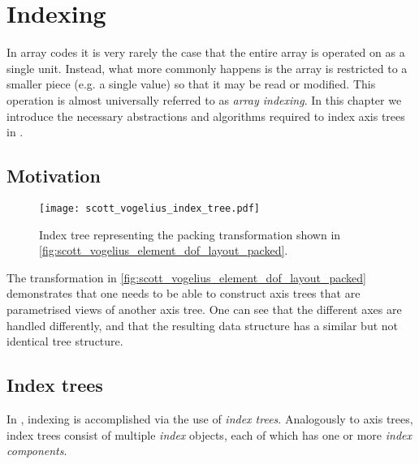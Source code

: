 \documentclass[thesis]{subfiles}
\begin{document}
\chapter{Indexing}
\label{chapter:indexing}

In array codes it is very rarely the case that the entire array is operated on as a single unit.
Instead, what more commonly happens is the array is restricted to a smaller piece (e.g. a single value) so that it may be read or modified.
This operation is almost universally referred to as \textit{array indexing}.
In this chapter we introduce the necessary abstractions and algorithms required to index axis trees in .

\section{Motivation}  %

\begin{figure}
  \centering
  \texttt{[image: scott\_vogelius\_index\_tree.pdf]}
  \caption{Index tree representing the packing transformation shown in \cref{fig:scott_vogelius_element_dof_layout_packed}.}
  \label{fig:scott_vogelius_element_index_tree}
\end{figure}



The transformation in \cref{fig:scott_vogelius_element_dof_layout_packed} demonstrates that one needs to be able to construct axis trees that are parametrised views of another axis tree.
One can see that the different axes are handled differently, and that the resulting data structure has a similar but not identical tree structure.

\section{Index trees}
\label{sec:index_trees}

In , indexing is accomplished via the use of \textit{index trees}.
Analogously to axis trees, index trees consist of multiple \textit{index} objects, each of which has one or more \textit{index components}.
\end{document}
